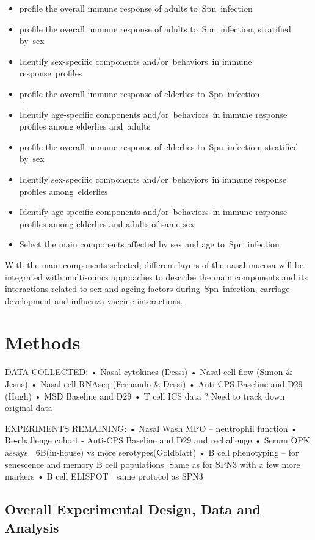 \documentclass[
]{book}
\begin{document}
\begin{itemize}
\item
  profile the overall immune response of adults to~Spn~infection
\item
  profile the overall immune response of adults to~Spn~infection, stratified by~sex
\item
  Identify sex-specific components and/or~behaviors~in immune response~profiles
\item
  profile the overall immune response of elderlies to~Spn~infection
\item
  Identify age-specific components and/or~behaviors~in immune response profiles among elderlies and~adults
\item
  profile the overall immune response of elderlies to~Spn~infection, stratified by~sex
\item
  Identify sex-specific components and/or~behaviors~in immune response profiles among~elderlies
\item
  Identify age-specific components and/or~behaviors~in immune response profiles among elderlies and adults of same-sex
\item
  Select the main components affected by sex and age to~Spn~infection
\end{itemize}

With the main components selected, different layers of the nasal mucosa will be integrated with multi-omics approaches to describe the main components and its interactions related to sex and ageing factors during~Spn~infection, carriage development and influenza vaccine interactions.

\hypertarget{methods}{%
\chapter{Methods}\label{methods}}

DATA COLLECTED: • Nasal cytokines (Dessi) • Nasal cell flow (Simon \& Jesus) • Nasal cell RNAseq (Fernando \& Dessi) • Anti-CPS Baseline and D29 (Hugh) • MSD Baseline and D29 • T cell ICS data ? Need to track down original data

EXPERIMENTS REMAINING: • Nasal Wash MPO -- neutrophil function • Re-challenge cohort - Anti-CPS Baseline and D29 and rechallenge • Serum OPK assays  6B(in-house) vs more serotypes(Goldblatt) • B cell phenotyping -- for senescence and memory B cell populations Same as for SPN3 with a few more markers • B cell ELISPOT  same protocol as SPN3

\hypertarget{overall-experimental-design-data-and-analysis}{%
\section{Overall Experimental Design, Data and Analysis}\label{overall-experimental-design-data-and-analysis}}
\end{document}
